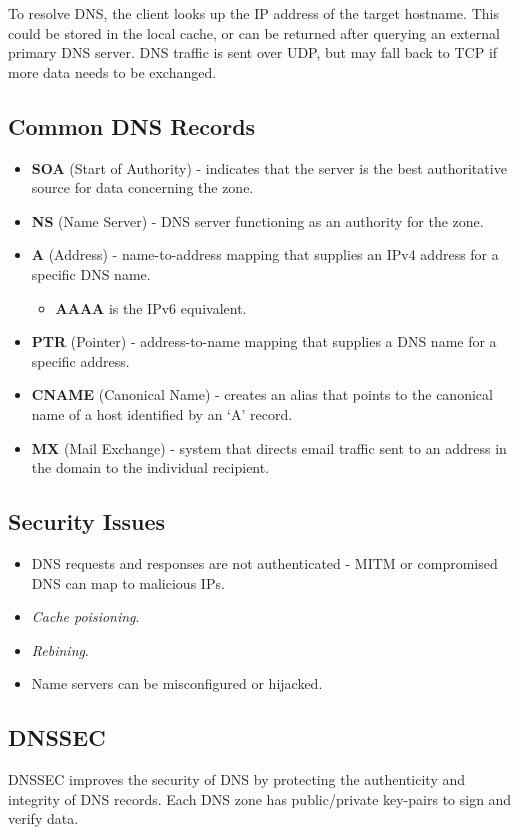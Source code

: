 \documentclass[11pt]{article}
\begin{document}
To resolve DNS, the client looks up the IP address of the target hostname.
This could be stored in the local cache, or can be returned after querying an external primary DNS server.
DNS traffic is sent over UDP, but may fall back to TCP if more data needs to be exchanged.

\subsection{Common DNS Records}
\begin{itemize}
  \item \textbf{SOA} (Start of Authority) - indicates that the server is the best authoritative source for data concerning the zone.
  \item \textbf{NS} (Name Server) - DNS server functioning as an authority for the zone.
  \item \textbf{A} (Address) - name-to-address mapping that supplies an IPv4 address for a specific DNS name.
    \begin{itemize}
      \item \textbf{AAAA} is the IPv6 equivalent.
    \end{itemize}
  \item \textbf{PTR} (Pointer) - address-to-name mapping that supplies a DNS name for a specific address.
  \item \textbf{CNAME} (Canonical Name) - creates an alias that points to the canonical name of a host identified by an `A' record.
  \item \textbf{MX} (Mail Exchange) - system that directs email traffic sent to an address in the domain to the individual recipient.
\end{itemize}

\subsection{Security Issues}
\begin{itemize}
  \item DNS requests and responses are not authenticated - MITM or compromised DNS can map to malicious IPs.
  \item \textit{Cache poisioning}.
  \item \textit{Rebining}.
  \item Name servers can be misconfigured or hijacked.
\end{itemize}

\subsection{DNSSEC}
DNSSEC improves the security of DNS by protecting the authenticity and integrity of DNS records.
Each DNS zone has public/private key-pairs to sign and verify data.
\end{document}
